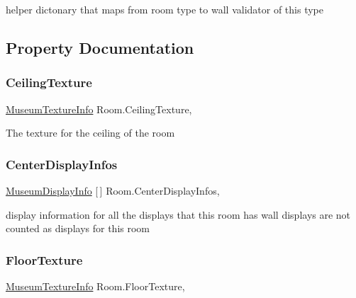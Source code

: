 helper dictonary that maps from room type to wall validator of this type 



\subsection{Property Documentation}
\mbox{\label{class_room_a415866d8fd49a481729fa9782f348d8d}} 
\subsubsection{\texorpdfstring{Ceiling\+Texture}{CeilingTexture}}
{\footnotesize\ttfamily \mbox{\hyperlink{class_museum_texture_info}{Museum\+Texture\+Info}} Room.\+Ceiling\+Texture\hspace{0.3cm}{\ttfamily [get]}, {\ttfamily [set]}}



The texture for the ceiling of the room 

\mbox{\label{class_room_ab7a1da4fa70bf843d643391bdbaa1fb5}} 
\subsubsection{\texorpdfstring{Center\+Display\+Infos}{CenterDisplayInfos}}
{\footnotesize\ttfamily \mbox{\hyperlink{class_museum_display_info}{Museum\+Display\+Info}} \mbox{[}$\,$\mbox{]} Room.\+Center\+Display\+Infos\hspace{0.3cm}{\ttfamily [get]}, {}}



display information for all the displays that this room has wall displays are not counted as displays for this room 

\mbox{\label{class_room_a53b139a4a9f372914e9c574b42f0a8b2}} 
\subsubsection{\texorpdfstring{Floor\+Texture}{FloorTexture}}
{\footnotesize\ttfamily \mbox{\hyperlink{class_museum_texture_info}{Museum\+Texture\+Info}} Room.\+Floor\+Texture\hspace{0.3cm}{\ttfamily [get]}, {\ttfamily [set]}}



